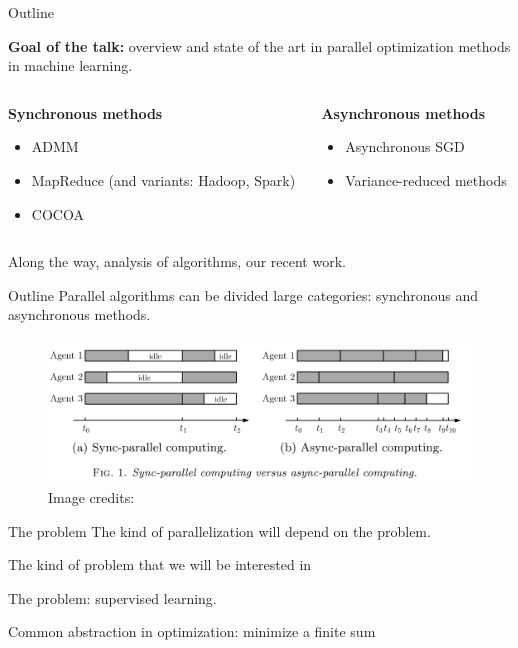 \documentclass[10pt]{beamer}
\begin{document}
\begin{frame}{Outline}

{\bfseries Goal of the talk:} overview and state of the art in parallel optimization methods in machine learning.

\medskip

\begin{columns}[T] %
\begin{column}{.5\textwidth}
{\centering \bfseries Synchronous methods}
\begin{itemize}
\item ADMM
\item MapReduce (and variants: Hadoop, Spark)
\item COCOA
\end{itemize}
\end{column}%
\hfill%
\begin{column}{.5\textwidth}
{\centering \bfseries Asynchronous methods}
\begin{itemize}
\item Asynchronous SGD
\item Variance-reduced methods
\end{itemize}
\end{column}%
\end{columns}
\vspace{1em}

Along the way, analysis of algorithms, our recent work.

\end{frame}

\begin{frame}{Outline}
Parallel algorithms can be divided  large categories: 
synchronous and asynchronous methods.

\begin{figure}
\includegraphics[width=\linewidth]{img/sync_vs_async}
{\small Image credits: \parencite{peng2016arock}}
\end{figure}
\end{frame}


\begin{frame}{The problem}
The kind of parallelization will depend on the problem.

The kind of problem that we will be interested in

The problem: supervised learning.

Common abstraction in optimization: minimize a finite sum
\end{frame}
\end{document}
